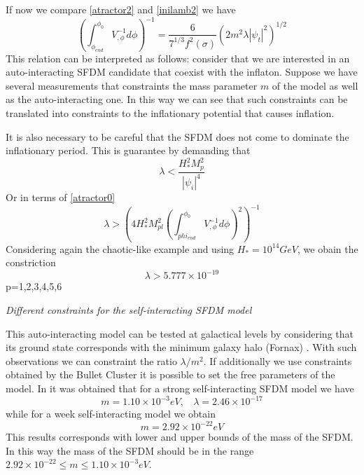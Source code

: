 \documentclass[amssymb,twocolumn,prd,nofootinbib,showpacs]{revtex4-1}
\begin{document}
If now we compare \eqref{atractor2} and \eqref{inilamb2} we have
\begin{equation}\label{inilamb3}
\left(\int_{\phi_{end}}^{\phi_0}V^{-1}_{,\phi}d\phi\right)^{-1}=\frac{6}{7^{1/3}f^2(\sigma)}\left(2m^2\lambda|\psi_t|^2\right)^{1/2}
\end{equation}
This relation can be interpreted as follows: consider that we are interested in an auto-interacting SFDM candidate that coexist with the inflaton. Suppose we have several measurements that constraints the mass parameter $m$ of the model as well as the auto-interacting one. In this way we can see that such constraints can be translated into constraints to the inflationary potential that causes inflation.  

It is also necessary to be careful that the SFDM does not come to dominate the inflationary period.  This is guarantee by demanding that
\begin{equation}
\lambda < \frac{H_*^2 M_p^2}{|\psi_i|^4}
\end{equation}
Or in terms of \eqref{atractor0}
\begin{equation}
\lambda>\left(4H_*^2M_{pl}^2\left(\int_{phi_{end}}^{\phi_0}V_{,\phi}^{-1}d\phi\right)^2\right)^{-1}
\end{equation}
Considering again the chaotic-like example and using $H_*= 10^{14} GeV$, we obain the constriction
\begin{equation}\label{lowerlambda}
\lambda > 5.777\times 10^{-19}
\end{equation}p=1,2,3,4,5,6

\textit{Different constraints for the self-interacting SFDM model}

This auto-interacting model can be tested at galactical levels by considering that its ground state corresponds with the minimum galaxy halo (Fornax) \cite{SFphi42}. With such observations we can constraint the ratio $\lambda/m^2$. If additionally we use constraints obtained by the Bullet Cluster \cite{bullet} it is possible to set the free parameters of the model. In \cite{SFphi42} it was obtained that for a strong self-interacting SFDM model we have
\begin{equation}
m= 1.10\times10^{-3}eV, \ \ \ \ \lambda = 2.46\times 10^{-17}
\end{equation}
while for a week self-interacting model we obtain
\begin{equation}
m= 2.92\times 10^{-22}eV
\end{equation}
This results corresponds with lower and upper bounds of the mass of the SFDM. In this way the mass of the SFDM should be in the range $2.92\times 10^{-22}\leq m\leq 1.10\times 10^{-3}eV$.
\end{document}
